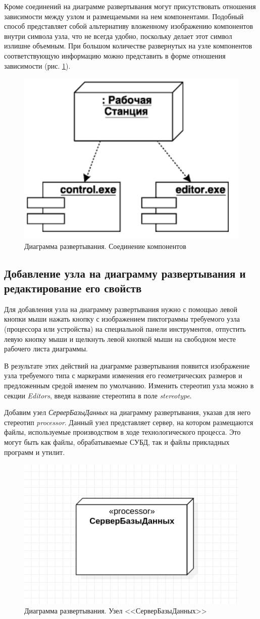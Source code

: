 \documentclass[a4paper,12pt]{report}
\begin{document}
Кроме соединений на диаграмме развертывания могут присутствовать отношения зависимости между узлом и размещаемыми на нем компонентами. Подобный способ представляет собой альтернативу вложенному изображению компонентов внутри символа узла, что не всегда удобно, поскольку делает этот символ излишне объемным. При большом количестве развернутых на узле компонентов соответствующую информацию можно представить в форме отношения зависимости (рис. \ref{fig:deployementbuses1}).
\begin{figure}[h!]
	\centering
	\includegraphics[width=0.4\linewidth]{images/deployementbuses1}
	\caption{Диаграмма развертывания. Соединение компонентов}
	\label{fig:deployementbuses1}
\end{figure}


\subsection*{Добавление узла на диаграмму развертывания и редактирование его свойств}

Для добавления узла на диаграмму развертывания нужно с помощью левой кнопки мыши нажать кнопку с изображением пиктограммы требуемого узла (процессора или устройства) на специальной панели инструментов, отпустить левую кнопку мыши и щелкнуть левой кнопкой мыши на свободном месте рабочего листа диаграммы.

В результате этих действий на диаграмме развертывания появится изображение узла требуемого типа с маркерами изменения его геометрических размеров и предложенным средой именем по умолчанию. Изменить стереотип узла можно в секции \textit{Editors}, введя название стереотипа в поле \textit{stereotype}.

Добавим узел \textit{СерверБазыДанных} на диаграмму развертывания, указав для него стереотип \textit{processor}. Данный узел представляет сервер, на котором размещаются файлы, используемые производством в ходе технологического процесса. Это могут быть как файлы, обрабатываемые СУБД, так и файлы прикладных программ и утилит.
\begin{figure}[h!]
	\centering
	\includegraphics[width=0.5\linewidth]{images/deployementnode}
	\caption{Диаграмма развертывания. Узел <<СерверБазыДанных>>}
	\label{fig:deployementnode}
\end{figure}
\end{document}
